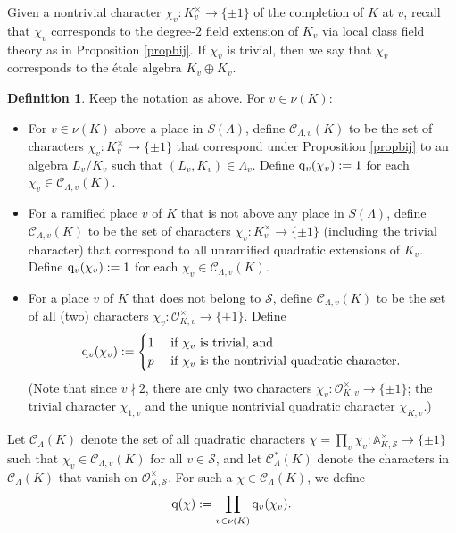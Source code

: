 \documentclass[10pt]{article}
\theoremstyle{plain}
\theoremstyle{definition}
\newtheorem{defn}[thm]{Definition}
\theoremstyle{remark}
\def\val{{\nu}}
\def\bA{{\mathbb A}}
\def\cC{{\mathcal C}}
\def\cO{{\mathcal O}}
\def\cS{{\mathcal S}}
\newcommand{\q}{{\rm q}}
\begin{document}
Given a nontrivial character $\chi_v:K_v^\times\to\{\pm1\}$ of the completion of $K$ at $v$, recall
that $\chi_v$ corresponds to the degree-$2$ field extension of $K_v$
via local class field theory as in Proposition \ref{propbij}. If
$\chi_v$ is trivial, then we say that $\chi_v$ corresponds to the
\'etale algebra $K_v \oplus K_v$. 
\begin{defn}\label{ccdef}
Keep the notation as above. For $v\in\val(K)$:
\begin{itemize}
\item[{\rm (a)}] For $v\in\val(K)$ above a place in $S(\Lambda)$,
  define $\cC_{\Lambda,v}(K)$ to be the set of characters
  $\chi_v:K_v^\times\to\{\pm 1\}$ that correspond under Proposition \ref{propbij} to an algebra
  $L_v/K_v$ such that $(L_v,K_v)\in\Lambda_v$. Define
$\q_v(\chi_v):=1$ for each $\chi_v \in \cC_{\Lambda,v}(K)$.  
\item[{\rm (b)}] For a ramified place $v$ of $K$ that is not above any
  place in $S(\Lambda)$, define $\cC_{\Lambda,v}(K)$ to be the set of
  characters $\chi_v:K_v^\times\to\{\pm 1\}$ (including the trivial character) that correspond to all
  unramified quadratic extensions of $K_v$. Define
$\q_v(\chi_v):=1$ for each $\chi_v \in \cC_{\Lambda,v}(K)$.   
\item[{\rm (c)}] For a place $v$ of $K$ that does not belong to $\cS$,
  define $\cC_{\Lambda,v}(K)$ to be the set of all (two) characters
  $\chi_v:\cO_{K,v}^\times\to\{\pm1\}$. Define
\begin{equation*}
\q_v(\chi_v) := \begin{cases} 1 & \mbox{ if $\chi_v$ is
trivial, and} \\ p & \mbox{ if $\chi_v$ is the nontrivial
quadratic character.}
\end{cases}
\end{equation*}
(Note that since $v\nmid 2$, there are only two characters $\chi_v:
\cO_{K,v}^\times \rightarrow \{\pm 1\}$; the trivial character
$\chi_{1,v}$ and the unique nontrivial quadratic character
$\chi_{K,v}$.)
\end{itemize}
Let $\cC_{\Lambda}(K)$ denote the set of all quadratic characters
$\chi =\prod_v \chi_v: \bA^\times_{K,\cS} \rightarrow \{\pm 1\}$ such
that $\chi_v \in \cC_{\Lambda,v}(K)$ for all $v \in \cS$, and
let $\cC^{\ast}_{\Lambda}(K)$ denote the characters in
$\cC_{\Lambda}(K)$ that vanish on $\cO_{K,\cS}^\times$. 
For such a $\chi\in\cC_{\Lambda}(K)$, 
we define
\begin{equation}\label{qqdef}
\q(\chi):=\prod_{v\in\val(K)}\q_v(\chi_v).
\end{equation}
\end{defn}
\end{document}
